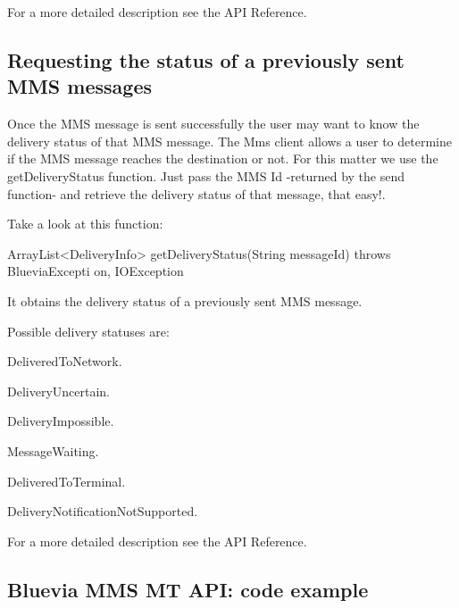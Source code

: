 For a more detailed description see the API Reference.\hypertarget{blv_mms_mt_guide_requesting_status_sec}{}\subsection{Requesting the status of a previously sent MMS messages}\label{blv_mms_mt_guide_requesting_status_sec}
Once the MMS message is sent successfully the user may want to know the delivery status of that MMS message. The Mms client allows a user to determine if the MMS message reaches the destination or not. For this matter we use the getDeliveryStatus function. Just pass the MMS Id -\/returned by the send function-\/ and retrieve the delivery status of that message, that easy!.

Take a look at this function: 
\begin{DoxyCode}
ArrayList<DeliveryInfo> getDeliveryStatus(String messageId) throws BlueviaExcepti
      on, IOException 
\end{DoxyCode}
 It obtains the delivery status of a previously sent MMS message.

Possible delivery statuses are: 
\begin{DoxyItemize}
\item DeliveredToNetwork. 
\item DeliveryUncertain. 
\item DeliveryImpossible. 
\item MessageWaiting. 
\item DeliveredToTerminal. 
\item DeliveryNotificationNotSupported. 
\end{DoxyItemize}

For a more detailed description see the API Reference.\hypertarget{blv_mms_mo_guide_mms_api_code_example_sec}{}\subsection{Bluevia MMS MT API: code example}\label{blv_mms_mo_guide_mms_api_code_example_sec}

